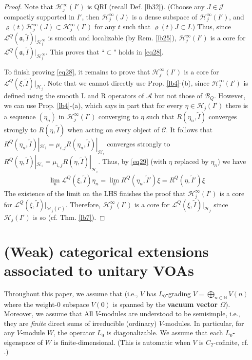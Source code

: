 \documentclass[11pt,b5paper,notitlepage]{article}
\theoremstyle{definition}
\theoremstyle{plain}
\newcommand{\fk}{\mathfrak}
\newcommand{\mc}{\mathcal}
\newcommand{\wtd}{\widetilde}
\newcommand{\scr}{\mathscr}
\newcommand{\Nbb}{\mathbb N}
\newcommand{\Zbb}{\mathbb Z}
\numberwithin{equation}{section}
\begin{document}
\begin{proof}
Note that $\mc H_j^\infty(I')$ is QRI (recall Def. \ref{lb32}). (Choose any $J\in\mc J$ compactly supported in $I'$, then $\mc H_j^\infty(J)$ is a dense subspace of $\mc H_j^\infty(I')$, and $\varrho(t)\mc H_j^\infty(J)\subset\mc H_j^\infty(I')$ for any $t$ such that $\varrho(t)J\subset I$.) Thus, since $\mc L^Q(\fk a,\wtd I)|_{\mc H_j^\infty}$ is smooth and localizable (by Rem. \ref{lb25}), $\mc H_j^\infty(I')$ is a core for $\mc L^Q(\fk a,\wtd I)|_{\mc H_j^\infty}$. This proves that ``$\subset$" holds in \eqref{eq28}.


To finish proving \eqref{eq28}, it remains to prove that $\mc H_j^\infty(I')$ is a core for $\scr L^Q(\xi,\wtd I)|_{\mc H_j}$. Note that we cannot directly use Prop. \ref{lb4}-(b), since $\mc H_j^\infty(I')$ is defined using the smooth L and R operators of $\mc A$ but not those of $\mc B_Q$. However, we can use Prop. \ref{lb4}-(a), which says in part that for every $\eta\in\mc H_j(I')$ there is a sequence $(\eta_n)$ in $\mc H_j^\infty(I')$ converging to $\eta$ such that $R(\eta_n,\wtd I)$ converges strongly to $R(\eta,\wtd I)$ when acting on every object of $\scr C$. It follows that $R^Q(\eta_n,\wtd I)|_{\mc H_i}=\mu_{i,j}R(\eta_n,\wtd I)|_{\mc H_i}$ converges strongly to $R^Q(\eta,\wtd I)|_{\mc H_i}=\mu_{i,j}R(\eta,\wtd I)|_{\mc H_i}$. Thus, by \eqref{eq29} (with $\eta$ replaced by $\eta_n$) we have
\begin{align*}
\lim_n\scr L^Q(\xi,\wtd I)\eta_n=\lim_nR^Q(\eta_n,\wtd I')\xi=R^Q(\eta,\wtd I')\xi
\end{align*}
The existence of the limit on the LHS finishes the proof that $\mc H_j^\infty(I')$ is a core for $\scr L^Q(\xi,\wtd I)|_{\mc H_j(I')}$. Therefore,  $\mc H_j^\infty(I')$ is a core for $\scr L^Q(\xi,\wtd I)|_{\mc H_j}$ since $\mc H_j(I')$ is so (cf. Thm. \ref{lb7}).
\end{proof}




\section{(Weak) categorical extensions associated to unitary VOAs}


Throughout this paper, we assume that  (i.e., $V$ has $L_0$-grading $V=\bigoplus_{n\in\Nbb}V(n)$ where the weight-$0$ subspace $V(0)$ is spanned by the \textbf{vacuum vector $\Omega$}). Moreover, we assume that \uwave{$V(n)$ is finite-dimensional for each $n\in\Zbb$.}  All $V$-modules are understood to be semisimple, i.e., they are \textit{finite} direct sums of irreducible (ordinary) $V$-modules. In particular, for any $V$-module $W$, the operator $L_0$ is diagonalizable. We assume that each $L_0$-eigenspace of $W$ is finite-dimensional. (This is automatic when $V$ is $C_2$-cofinite, cf. \cite{Buhl02}.)
\end{document}
